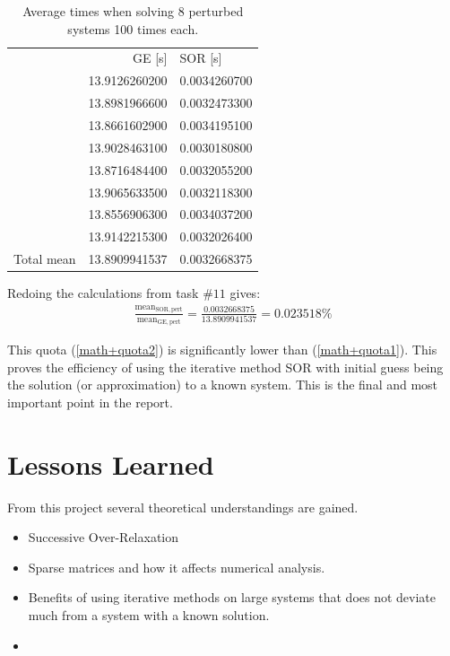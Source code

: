 \documentclass[10pt, a4paper]{article}
\begin{document}
\begin{table}[h]
\begin{center}
\begin{tabular}{l l | l}
\multicolumn{2}{r}{GE [s]} & SOR [s]  \\ \cline{2-3}
		& 13.9126260200 & 0.0034260700 \\
		& 13.8981966600 & 0.0032473300 \\
		& 13.8661602900 & 0.0034195100 \\
		& 13.9028463100 & 0.0030180800 \\
		& 13.8716484400 & 0.0032055200 \\
		& 13.9065633500 & 0.0032118300 \\
		& 13.8556906300 & 0.0034037200 \\
		& 13.9142215300 & 0.0032026400 \\ \cline{2-3}
Total mean	& 13.8909941537 & 0.0032668375
\end{tabular}
\caption{Average times when solving 8 perturbed systems 100 times each.}
\end{center}
\label{table+avgpert}
\end{table}

Redoing the calculations from task $\#11$ gives:
\begin{eqnarray}
	\frac{\mathrm{mean}_{\mathrm{SOR, pert}}}{\mathrm{mean}_{\mathrm{GE, pert}}}=\frac{0.0032668375}{13.8909941537} =  0.023518\% \label{math+quota2}
\end{eqnarray}

This quota (\ref{math+quota2}) is significantly lower than (\ref{math+quota1}). This proves the efficiency of using the iterative method SOR with initial guess being the solution (or approximation) to a known system. This is the final and most important point in the report.

\section{Lessons Learned}
From this project several theoretical understandings are gained.
\begin{itemize}
	\item Successive Over-Relaxation
	\item Sparse matrices  and how it affects numerical analysis.
	\item Benefits of using iterative methods on large systems that does not deviate much from a system with a known solution.
	\item
\end{itemize}
\end{document}
